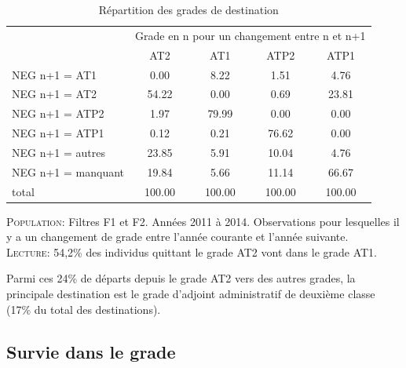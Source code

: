 \documentclass[11pt,a4paper]{article}
\begin{document}
\begin{table}[h!]
\centering
\caption{Répartition des grades de destination} 
\label{filters}
\begin{tabular}{lcccc}
\toprule
 & \multicolumn{4}{c}{Grade en n pour un changement entre n et n+1} \\
 & AT2 & AT1 & ATP2 & ATP1 \\ 
  \hline
NEG n+1 = AT1 & 0.00 & 8.22 & 1.51 & 4.76 \\ 
  NEG n+1 = AT2 & 54.22 & 0.00 & 0.69 & 23.81 \\ 
  NEG n+1 = ATP2 & 1.97 & 79.99 & 0.00 & 0.00 \\ 
  NEG n+1 = ATP1 & 0.12 & 0.21 & 76.62 & 0.00 \\ 
  NEG n+1 = autres & 23.85 & 5.91 & 10.04 & 4.76 \\ 
  NEG n+1 = manquant & 19.84 & 5.66 & 11.14 & 66.67 \\ 
  total & 100.00 & 100.00 & 100.00 & 100.00 \\ 
   \hline
\bottomrule
\end{tabular}
\end{table}
\begin{minipage}{12cm}
\footnotesize
\textsc{Population:} Filtres F1 et F2. Années 2011 à 2014. Observations pour lesquelles il y a un changement de grade entre l'année courante et l'année suivante. \\
\textsc{Lecture:} 54,2\% des individus quittant le grade AT2 vont dans le grade AT1.
\end{minipage}

Parmi ces 24\% de départs depuis le grade AT2 vers des autres grades, la principale destination est le grade d'adjoint administratif de deuxième classe (17\% du total des destinations). 




\subsection{Survie dans le grade}
\end{document}
